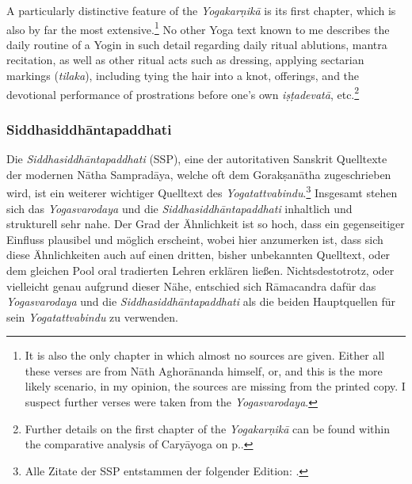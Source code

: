   A particularly distinctive feature of the \emph{Yogakarṇikā} is its first chapter, which is also by far the most extensive.\footnote{It is also the only chapter in which almost no sources are given. Either all these verses are from Nāth Aghorānanda himself, or, and this is the more likely scenario, in my opinion, the sources are missing from the printed copy. I suspect further verses were taken from the \emph{Yogasvarodaya}.} No other Yoga text known to me describes the daily routine of a Yogin in such detail regarding daily ritual ablutions, mantra recitation, as well as other ritual acts such as dressing, applying sectarian markings (\textit{tilaka}), including tying the hair into a knot, offerings, and the devotional performance of prostrations before one's own \textit{iṣṭadevatā}, etc.\footnote{Further details on the first chapter of the \emph{Yogakarṇikā} can be found within the comparative analysis of Caryāyoga on p.\pageref{caryasvaro}.}

\subsubsection{Siddhasiddhāntapaddhati}

Die \emph{Siddhasiddhāntapaddhati} (SSP), eine der autoritativen Sanskrit Quelltexte der modernen Nātha Sampradāya, welche oft dem Gorakṣanātha zugeschrieben wird, ist ein weiterer wichtiger Quelltext des \emph{Yogatattvabindu}.\footnote{Alle Zitate der SSP entstammen der folgender Edition: \cite{ssplonavla}.} Insgesamt stehen sich das \emph{Yogasvarodaya} und die \emph{Siddhasiddhāntapaddhati} inhaltlich und strukturell sehr nahe. Der Grad der Ähnlichkeit ist so hoch, dass ein gegenseitiger Einfluss plausibel und möglich erscheint, wobei hier anzumerken ist, dass sich diese Ähnlichkeiten auch auf einen dritten, bisher unbekannten Quelltext, oder dem gleichen Pool oral tradierten Lehren erklären ließen. Nichtsdestotrotz, oder vielleicht genau aufgrund dieser Nähe, entschied sich Rāmacandra dafür das \emph{Yogasvarodaya} und die \emph{Siddhasiddhāntapaddhati} als die beiden Hauptquellen für sein \emph{Yogatattvabindu} zu verwenden.  

